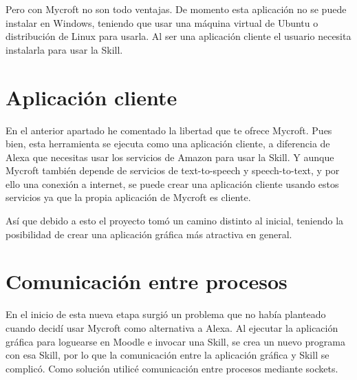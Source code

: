 Pero con Mycroft no son todo ventajas. De momento esta aplicación no se puede instalar en Windows, teniendo que usar una máquina virtual de Ubuntu o distribución de Linux para usarla. Al ser una aplicación cliente el usuario necesita instalarla para usar la Skill.

\section{Aplicación cliente}

En el anterior apartado he comentado la libertad que te ofrece Mycroft. Pues bien, esta herramienta se ejecuta como una aplicación cliente, a diferencia de Alexa que necesitas usar los servicios de Amazon para usar la Skill. Y aunque Mycroft también depende de servicios de text-to-speech y speech-to-text, y por ello una conexión a internet, se puede crear una aplicación cliente usando estos servicios ya que la propia aplicación de Mycroft es cliente.

Así que debido a esto el proyecto tomó un camino distinto al inicial, teniendo la posibilidad de crear una aplicación gráfica más atractiva en general.

\section{Comunicación entre procesos}

En el inicio de esta nueva etapa surgió un problema que no había planteado cuando decidí usar Mycroft como alternativa a Alexa. Al ejecutar la aplicación gráfica para loguearse en Moodle e invocar una Skill, se crea un nuevo programa con esa Skill, por lo que la comunicación entre la aplicación gráfica y Skill se complicó. Como solución utilicé comunicación entre procesos mediante sockets.